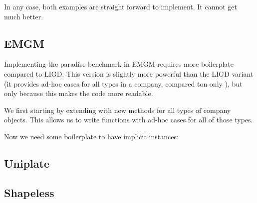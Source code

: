 In any case, both examples are straight forward to implement. It cannot get
much better.


\subsection{EMGM}

Implementing the paradise benchmark in EMGM requires more boilerplate compared
to LIGD. This version is slightly more powerful than the LIGD variant (it
provides ad-hoc cases for all types in a company, compared ton only ),
but only because this makes the code more readable.

We first starting by extending  with new methods for all types of
company objects. This allows us to write functions with ad-hoc cases for all
of those types.



Now we need some boilerplate to have implicit  instances:




\begin{example}

\end{example}

\begin{example}

\end{example}

\subsection{Uniplate}


\begin{example}

\end{example}

\begin{example}

\end{example}


\subsection{Shapeless}

